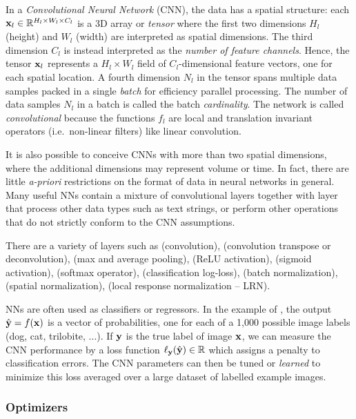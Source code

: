In a \emph{Convolutional Neural Network} (CNN), the data has a spatial structure: each $\mathbf{x}_l\in\mathbb{R}^{H_l \times W_l \times C_l}$ is a 3D array or \emph{tensor} where the first two dimensions $H_l$ (height) and $W_l$ (width) are interpreted as spatial dimensions. The third dimension $C_l$ is instead interpreted as the \emph{number of feature channels}. Hence, the tensor $\mathbf{x}_l$ represents a $H_l \times W_l$ field of $C_l$-dimensional feature vectors, one for each spatial location. A fourth dimension $N_l$ in the tensor spans multiple data samples packed in a single \emph{batch} for efficiency parallel processing. The number of data samples $N_l$ in a batch is called the batch \emph{cardinality}. The network is called \emph{convolutional} because the functions $f_l$ are local and translation invariant operators (i.e.\ non-linear filters) like linear convolution.

It is also possible to conceive CNNs with more than two spatial dimensions, where the additional dimensions may represent volume or time. In fact, there are little \emph{a-priori} restrictions on the format of data in neural networks in general. Many useful NNs contain a mixture of convolutional layers together with layer that process other data types such as text strings, or perform other operations that do not strictly conform  to the CNN assumptions.

There are a variety of layers such as (convolution),  (convolution transpose or deconvolution),  (max and average pooling),  (ReLU activation),  (sigmoid activation),  (softmax operator),  (classification log-loss), (batch normalization), (spatial normalization), (local response normalization -- LRN). 

NNs are often used as classifiers or regressors. In the example of , the output $\hat {\mathbf{y}} = f(\mathbf{x})$ is a vector of probabilities, one for each of a 1,000 possible image labels (dog, cat, trilobite, ...).  If $\mathbf{y}$ is the true label of image $\mathbf{x}$, we can measure the CNN performance by a loss function $\ell_{\mathbf{y}}(\hat {\mathbf{y}})  \in \mathbb{R}$ which assigns a penalty to classification errors. The CNN parameters can then be tuned or \emph{learned} to minimize this loss averaged over a large dataset of labelled example images.

\subsubsection{Optimizers}\label{s:cnn-optimizers}

